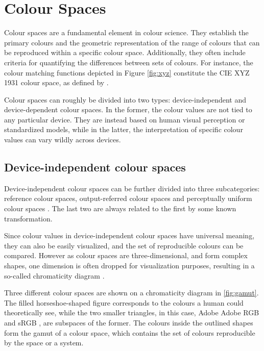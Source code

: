 \chapter{Colour Spaces}
\label{ch:cs}

Colour spaces are a fundamental element in colour science. They establish the primary colours and the geometric representation of the range of colours that can be reproduced within a specific colour space. Additionally, they often include criteria for quantifying the differences between sets of colours. For instance, the colour matching functions depicted in Figure \ref{fig:xyz} constitute the CIE XYZ 1931 colour space, as defined by \cite{cie1931}.

Colour spaces can roughly be divided into two types: device-independent and device-dependent colour spaces. In the former, the colour values are not tied to any particular device. They are instead based on human visual perception or standardized models, while in the latter, the interpretation of specific colour values can vary wildly across devices.


\section{Device-independent colour spaces}

Device-independent colour spaces can be further divided into three subcategories: reference colour spaces, output-referred colour spaces and perceptually uniform colour spaces \cite[ch.~4.1-4.5]{rowlands2020physics}. The last two are always related to the first by some known transformation. 

Since colour values in device-independent colour spaces have universal meaning, they can also be easily visualized, and the set of reproducible colours can be compared. However as colour spaces are three-dimensional, and form complex shapes, one dimension is often dropped for visualization purposes, resulting in a so-called chromaticity diagram \cite[42-44]{measuringcolour}.

Three different colour spaces are shown on a chromaticity diagram in \ref{fig:gamut}. The filled horseshoe-shaped figure corresponds to the colours a human could theoretically see, while the two smaller triangles, in this case, Adobe Adobe RGB \cite{adobeRGB} and sRGB \cite{sRGB}, are subspaces of the former. The colours inside the outlined shapes form the gamut of a colour space, which contains the set of colours reproducible by the space or a system.

